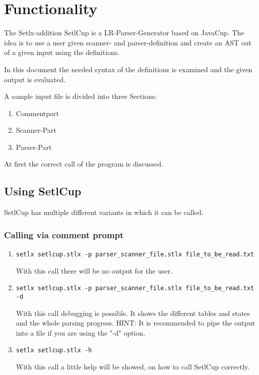 \chapter{Functionality}

The Setlx-addition SetlCup is a LR-Parser-Generator based on JavaCup.
The idea is to use a user given scanner- and parser-definition and create an AST out of a given input using the definitions.

In this document the needed syntax of the definitions is examined and the given output is evaluated.

A sample input file is divided into three Sections:
\begin{enumerate}
	\item Commentpart
	\item Scanner-Part
	\item Parser-Part
\end{enumerate}

At first the correct call of the program is discussed.
\section{Using SetlCup}
SetlCup has multiple different variants in which it can be called:
\subsection{Calling via comment prompt}
\begin{enumerate}
	\item \begin{verbatim}setlx setlcup.stlx -p parser_scanner_file.stlx file_to_be_read.txt \end{verbatim}
			With this call there will be no output for the user.
	\item \begin{verbatim}setlx setlcup.stlx -p parser_scanner_file.stlx file_to_be_read.txt -d\end{verbatim}
			With this call debugging is possible. It shows the different tables and states and the whole parsing progress. HINT: It is recommended to pipe the output into a file if you are using the "-d" option.
	\item \begin{verbatim}setlx setlcup.stlx -h\end{verbatim}
			With this call a little help will be showed, on how to call SetlCup correctly.
\end{enumerate}
